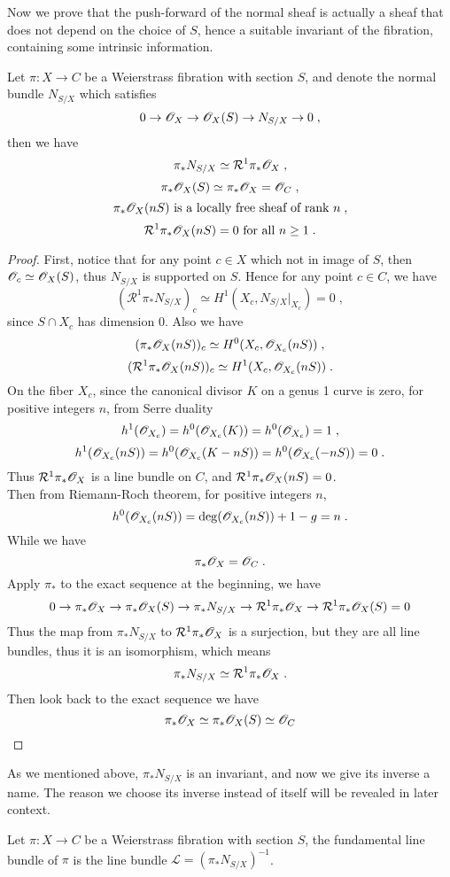 Now we prove that the push-forward of the normal sheaf is actually a sheaf that does not depend on the choice of $S$, hence a suitable invariant of the fibration, containing some intrinsic information.
\begin{prop}
Let $\pi\colon X\rightarrow C$ be a Weierstrass fibration with section $S$, and denote the normal bundle $N_{S/X}$ which satisfies
$$0\rightarrow \mathscr{O}_X\rightarrow \mathscr{O}_X(S)\rightarrow N_{S/X}\rightarrow 0\; ,$$
then we have
$$\pi_*N_{S/X}\simeq \mathcal{R}^1\pi_*\mathscr{O}_X\; ,$$
$$\pi_*\mathscr{O}_X(S)\simeq \pi_*\mathscr{O}_X=\mathscr{O}_C\; ,$$
$$\pi_*\mathscr{O}_X(nS)\textrm{ is a locally free sheaf of rank }n\; ,$$
$$\mathcal{R}^1\pi_*\mathscr{O}_X(nS)=0\textrm{ for all }n\geq 1\; .$$
\end{prop}
\begin{proof}
First, notice that for any point $c\in X$ which not in image of $S$, then $\mathscr{O}_c\simeq \mathscr{O}_X(S)$, thus $N_{S/X}$ is supported on $S$. Hence for any point $c\in C$, we have
$$(\mathcal{R}^1\pi_*N_{S/X})_c\simeq H^1(X_c, N_{S/X}|_{X_c})=0\; ,$$
since $S\cap X_c$ has dimension 0. Also we have
$$(\pi_*\mathscr{O}_X(nS))_c\simeq H^0(X_c, \mathscr{O}_{X_c}(nS))\; ,$$
$$(\mathcal{R}^1\pi_*\mathscr{O}_X(nS))_c\simeq H^1(X_c, \mathscr{O}_{X_c}(nS))\; .$$
On the fiber $X_c$, since the canonical divisor $K$ on a genus 1 curve is zero, for positive integers $n$, from Serre duality
$$h^1(\mathscr{O}_{X_c})=h^0(\mathscr{O}_{X_c}(K))=h^0(\mathscr{O}_{X_c})=1\; ,$$ 
$$h^1(\mathscr{O}_{X_c}(nS))=h^0(\mathscr{O}_{X_c}(K-nS))=h^0(\mathscr{O}_{X_c}(-nS))=0\; .$$
Thus $\mathcal{R}^1\pi_*\mathscr{O}_X$ is a line bundle on $C$, and $\mathcal{R}^1\pi_*\mathscr{O}_X(nS)=0$.\\ \indent
Then from Riemann-Roch theorem, for positive integers $n$,
$$h^0(\mathscr{O}_{X_c}(nS))=\deg(\mathscr{O}_{X_c}(nS))+1-g=n\; .$$
\indent While we have
$$\pi_*\mathscr{O}_X=\mathscr{O}_C\; .$$
\indent Apply $\pi_*$ to the exact sequence at the beginning, we have
$$0\rightarrow \pi_*\mathscr{O}_X\rightarrow \pi_*\mathscr{O}_X(S)\rightarrow \pi_*N_{S/X}\rightarrow \mathcal{R}^1\pi_*\mathscr{O}_X\rightarrow \mathcal{R}^1\pi_*\mathscr{O}_X(S)=0$$
\indent Thus the map from $\pi_*N_{S/X}$ to $\mathcal{R}^1\pi_*\mathscr{O}_X$ is a surjection, but they are all line bundles, thus it is an isomorphism, which means
$$\pi_*N_{S/X}\simeq \mathcal{R}^1\pi_*\mathscr{O}_X \; .$$
\indent Then look back to the exact sequence we have
$$\pi_*\mathscr{O}_X\simeq\pi_*\mathscr{O}_X(S)\simeq \mathscr{O}_C$$
\end{proof}
As we mentioned above, $\pi_*N_{S/X}$ is an invariant, and now we give its inverse a name. The reason we choose its inverse instead of itself will be revealed in later context.
\begin{defi}
Let $\pi\colon X\rightarrow C$ be a Weierstrass fibration with section $S$, the fundamental line bundle of $\pi$ is the line bundle $\mathcal{L}=(\pi_*N_{S/X})^{-1}$.
\end{defi}
